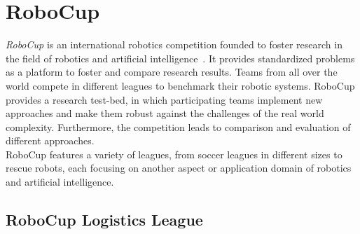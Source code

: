 \section{RoboCup}
\label{sec:robocup}
\emph{RoboCup} is an international robotics competition founded to
foster research in the field of robotics and artificial
intelligence~\cite{RoboCup-Paper}. It provides standardized problems
as a platform to foster and compare research results.  Teams from all
over the world compete in different leagues to benchmark their robotic
systems. RoboCup provides a research test-bed, in which participating
teams implement new approaches and make them robust against the
challenges of the real world complexity. Furthermore, the competition
leads to comparison and evaluation of different approaches.\\
%
RoboCup features a variety of leagues, from soccer leagues in
different sizes to rescue robots, each focusing on another aspect or
application domain of robotics and artificial intelligence.



\subsection{RoboCup Logistics League}

